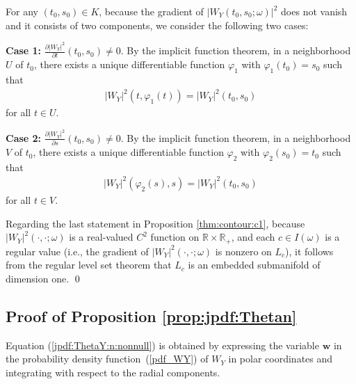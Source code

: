 \documentclass{amsart}
\begin{document}
For any $(t_{0},s_{0})\in K$, because the gradient of $|W_{Y}(t_0,s_0;\omega)|^2$ does not vanish
and
it consists of two components,
we consider the following two cases:


{\bf Case 1:} $\frac{\partial |W_{Y}|^2}{\partial t}(t_{0},s_{0})\neq 0.$
By the implicit function theorem,  in a neighborhood $U$ of $t_{0}$, there exists a unique differentiable function $\varphi_{1}$
with $\varphi_{1}(t_{0}) = s_{0}$
such that
\begin{align*}
|W_{Y}|^2\left(t,\varphi_{1}(t)\right)  = |W_{Y}|^2\left(t_{0},s_{0}\right)
\end{align*}
for all $t\in U$.


{\bf Case 2:} $\frac{\partial |W_{Y}|^2}{\partial s}(t_{0},s_{0})\neq 0.$
By the implicit function theorem,  in a neighborhood $V$ of $t_{0}$, there exists a unique differentiable function $\varphi_{2}$
with $\varphi_{2}(s_{0}) = t_{0}$
such that
\begin{align*}
|W_{Y}|^2\left(\varphi_{2}(s),s\right)  = |W_{Y}|^2\left(t_{0},s_{0}\right)
\end{align*}
for all $t\in V$.




Regarding the last statement in Proposition \ref{thm:contour:c1}, because $|W_{Y}|^2\left(\cdot,\cdot;\omega\right)$ is a real-valued $C^{2}$ function on $\mathbb{R}\times \mathbb{R}_{+}$, and each $c\in I(\omega)$ is a regular value (i.e., the gradient of $|W_{Y}|^2\left(\cdot,\cdot;\omega\right)$ is nonzero on $L_{c}$),
it follows from the regular level set theorem
that $L_{c}$ is an embedded submanifold of dimension one.
\qed








\subsection{Proof of Proposition \ref{prop:jpdf:Thetan}}\label{sec:proof:prop:jpdf:Thetan}
Equation (\ref{jpdf:ThetaY:n:nonnull}) is obtained by expressing the variable $\mathbf{w}$
in the probability density function~(\ref{pdf_WY}) of $W_{Y}$ in polar coordinates and integrating with respect to the radial components.
\end{document}
